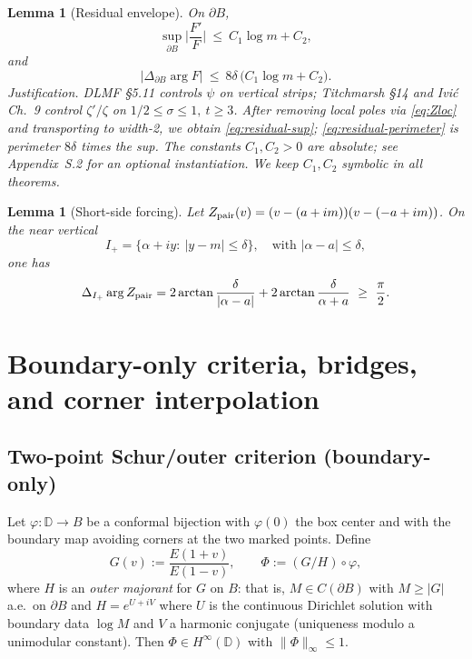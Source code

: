 \documentclass[11pt]{article}
\numberwithin{equation}{section}
\newtheorem{lemma}[theorem]{Lemma}
\theoremstyle{remark}
\newcommand{\D}{\mathbb{D}}
\begin{document}
\begin{lemma}[Residual envelope]\label{lem:residual}
On $\partial B$,
\begin{equation}\label{eq:residual-sup}
\sup_{\partial B}\Big|\frac{F'}{F}\Big|\ \le\ C_1\log m + C_2,
\end{equation}
and
\begin{equation}\label{eq:residual-perimeter}
\big|\Delta_{\partial B}\arg F\big|\ \le\ 8\delta\,\big(C_1\log m+C_2\big).
\end{equation}
\emph{Justification.} DLMF §5.11 controls $\psi$ on vertical strips; Titchmarsh §14 and Ivi\'c Ch.~9 control $\zeta'/\zeta$ on $1/2\le\sigma\le 1,\ t\ge 3$. After removing local poles via \eqref{eq:Zloc} and transporting to width-2, we obtain \eqref{eq:residual-sup}; \eqref{eq:residual-perimeter} is perimeter $8\delta$ times the sup. The constants $C_1,C_2>0$ are absolute; see Appendix~S.2 for an optional instantiation. We keep $C_1,C_2$ symbolic in all theorems.
\end{lemma}

\begin{lemma}[Short-side forcing]\label{lem:short-side}
Let $Z_{\rm pair}(v)=(v-(a+im))(v-(-a+im))$. On the near vertical
\[
I_+=\{\alpha+i y:\ |y-m|\le \delta\},\quad\text{with }|\alpha-a|\le\delta,
\]
one has
\begin{equation}\label{eq:short-side}
\Delta_{I_+}\arg Z_{\rm pair}
=2\arctan\frac{\delta}{|\alpha-a|}+2\arctan\frac{\delta}{\alpha+a}\ \ge\ \frac{\pi}{2}.
\end{equation}
\end{lemma}

\section{Boundary-only criteria, bridges, and corner interpolation}\label{sec:criteria}

\subsection{Two-point Schur/outer criterion (boundary-only)}\label{subsec:schur-criterion}

Let $\varphi:\D\to B$ be a conformal bijection with $\varphi(0)$ the box center and with the boundary map avoiding corners at the two marked points. Define
\begin{equation}\label{eq:schur-def}
G(v):=\frac{E(1+v)}{E(1-v)},\qquad \Phi:=(G/H)\circ\varphi,
\end{equation}
where $H$ is an \emph{outer majorant} for $G$ on $B$: that is, $M\in C(\partial B)$ with $M\ge |G|$ a.e.\ on $\partial B$ and $H=e^{U+iV}$ where $U$ is the continuous Dirichlet solution with boundary data $\log M$ and $V$ a harmonic conjugate (uniqueness modulo a unimodular constant). Then $\Phi\in H^\infty(\D)$ with $\|\Phi\|_\infty\le 1$.
\end{document}
